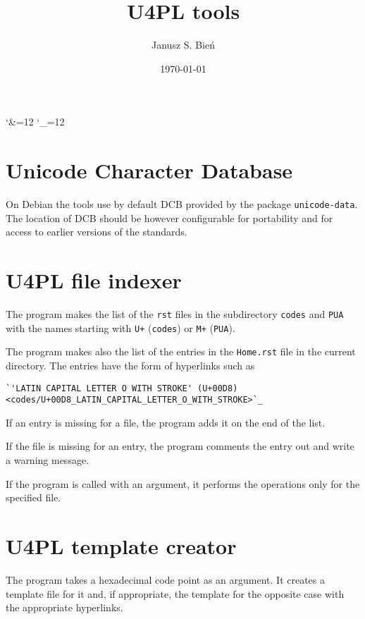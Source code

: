 \documentclass[12]{mwart}
\title{U4PL tools}
\author{Janusz S. Bień}
\date{\today}
\begin{document}
\maketitle

\catcode`\&=12
\catcode`\_=12

\section{Unicode Character Database}
\label{sec:unic-char-datab}

On Debian the tools use by default DCB provided by the package
\texttt{unicode-data}. The location of DCB should be however
configurable for portability and for access to earlier versions of the
standards.

\section{U4PL file indexer}
\label{sec:u4pl-file-indexer}

The program makes the list of the \texttt{rst} files in the
subdirectory \texttt{codes} and \texttt{PUA} with the names starting
with \texttt{U+} (\texttt{codes}) or \texttt{M+} (\texttt{PUA}).

The program makes also the list of the entries in the
\texttt{Home.rst} file in the current directory. The entries have the form
of hyperlinks such as

{
\begin{verbatim}
`'LATIN CAPITAL LETTER O WITH STROKE' (U+00D8) <codes/U+00D8_LATIN_CAPITAL_LETTER_O_WITH_STROKE>`_
\end{verbatim}
}

If an entry is missing for a file, the program adds it on the end of the list.

If the file is missing for an entry, the program comments the entry
out and write a warning message.

If the program is called with an argument, it performs the operations
only for the specified file.

\section{U4PL template creator}
\label{sec:u4pl-templ-creat}

The program takes a hexadecimal code point as an argument. It creates
a template file for it and, if appropriate, the template for the
opposite case with the appropriate hyperlinks.
\end{document}
